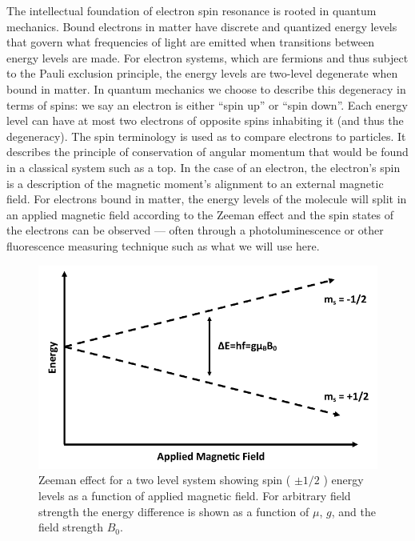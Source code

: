 \documentclass[oneside]{BYUPhys}
\begin{document}
The intellectual foundation of electron spin resonance is rooted in quantum mechanics. Bound electrons in matter have discrete and quantized energy levels that govern what frequencies of light are emitted when transitions between energy levels are made. For electron systems, which are fermions and thus subject to the Pauli exclusion principle, the energy levels are two-level degenerate when bound in matter. In quantum mechanics we choose to describe this degeneracy in terms of spins: we say an electron is either ``spin up'' or ``spin down''. Each energy level can have at most two electrons of opposite spins inhabiting it (and thus the degeneracy). The spin terminology is used as to compare electrons to particles. It describes the principle of conservation of angular momentum that would be found in a classical system such as a top. In the case of an electron, the electron's spin is a description of the magnetic moment's alignment to an external magnetic field. For electrons bound in matter, the energy levels of the molecule will split in an applied magnetic field according to the Zeeman effect and the spin states of the electrons can be observed --- often through a photoluminescence or other fluorescence measuring technique such as what we will use here.

\begin{figure}[h]
    \centerline{\includegraphics{zeeman_fig}}
    \caption[Zeeman Effect and Resonant Conditions in Matter]{\label{fig:Zeeman}
     Zeeman effect for a two level system showing spin ( $\pm 1/2$ ) energy levels as a function of applied magnetic field. For arbitrary field strength the energy difference is shown as a function of $\mu$, $g$, and the field strength $B_0$.}
\end{figure}
\end{document}
